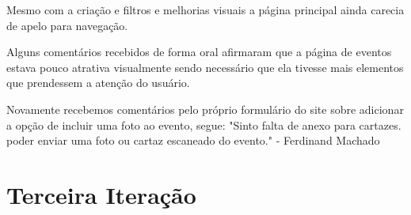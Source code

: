 \par Mesmo com a criação e filtros e melhorias visuais a página principal ainda carecia de apelo para navegação.
\par Alguns comentários recebidos de forma oral afirmaram que a página de eventos estava pouco atrativa visualmente sendo necessário que ela tivesse mais elementos que prendessem a atenção do usuário.

\par Novamente recebemos comentários pelo próprio formulário do site sobre adicionar a opção de incluir uma foto ao evento, segue: "Sinto falta de anexo para cartazes. poder enviar uma foto ou cartaz escaneado do evento." - Ferdinand Machado

\section{Terceira Iteração}
